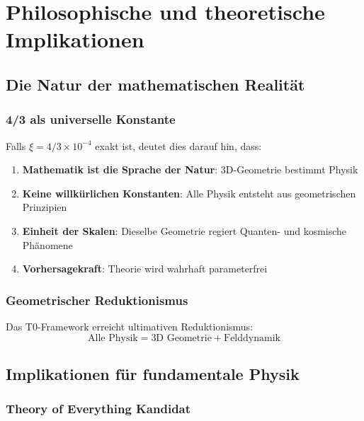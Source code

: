 \documentclass[12pt,a4paper]{article}
\newcommand{\xipar}{\ensuremath{\xi}}
\newcommand{\mytimes}{\ensuremath{\times}}
\begin{document}
	\section{Philosophische und theoretische Implikationen}
	\label{sec:philosophische_implikationen}
	
	\subsection{Die Natur der mathematischen Realität}
	\label{subsec:mathematische_realitaet}
	
	\subsubsection{4/3 als universelle Konstante}
	\label{subsubsec:vier_drittel_universell}
	
	Falls $\xipar = 4/3 \mytimes 10^{-4}$ exakt ist, deutet dies darauf hin, dass:
	
	\begin{enumerate}
		\item \textbf{Mathematik ist die Sprache der Natur}: 3D-Geometrie bestimmt Physik
		\item \textbf{Keine willkürlichen Konstanten}: Alle Physik entsteht aus geometrischen Prinzipien
		\item \textbf{Einheit der Skalen}: Dieselbe Geometrie regiert Quanten- und kosmische Phänomene
		\item \textbf{Vorhersagekraft}: Theorie wird wahrhaft parameterfrei
	\end{enumerate}
	
	\subsubsection{Geometrischer Reduktionismus}
	\label{subsubsec:geometrischer_reduktionismus}
	
	Das T0-Framework erreicht ultimativen Reduktionismus:
	\begin{equation}
		\boxed{\text{Alle Physik} = \text{3D Geometrie} + \text{Felddynamik}}
		\label{eq:ultimativer_reduktionismus}
	\end{equation}
	
	\subsection{Implikationen für fundamentale Physik}
	\label{subsec:fundamentale_physik}
	
	\subsubsection{Theory of Everything Kandidat}
	\label{subsubsec:toe_kandidat}
	
\end{document}

